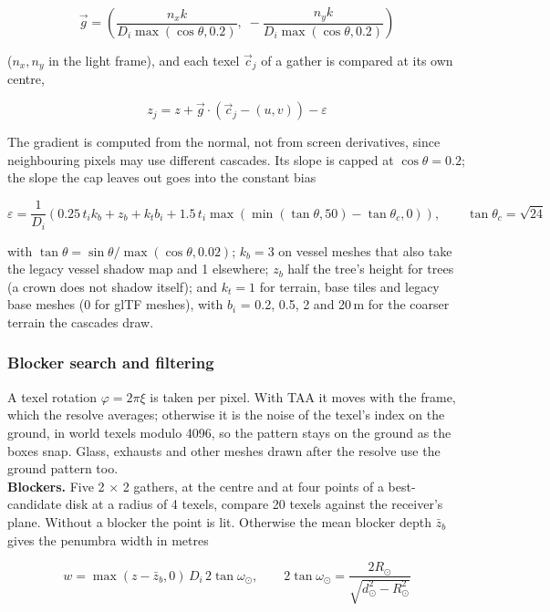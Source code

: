 \documentclass[Orbiter Technical Reference.tex]{subfiles}
\begin{document}
\begin{sloppypar}
\[ \vec{g} = \left( \frac{n_{x} k}{D_{i}\max(\cos\theta, 0.2)},\; -\frac{n_{y} k}{D_{i}\max(\cos\theta, 0.2)} \right) \]

\noindent
($n_{x}, n_{y}$ in the light frame), and each texel $\vec{c}_{j}$ of a gather is compared at its own centre,

\[ z_{j} = z + \vec{g} \cdot (\vec{c}_{j} - (u, v)) - \varepsilon \]

\noindent
The gradient is computed from the normal, not from screen derivatives, since neighbouring pixels may use different cascades. Its slope is capped at $\cos\theta = 0.2$; the slope the cap leaves out goes into the constant bias

\[ \varepsilon = \frac{1}{D_{i}} \left( 0.25\,t_{i}k_{b} + z_{b} + k_{t}b_{i} + 1.5\,t_{i} \max\left(\min\left(\tan\theta, 50\right) - \tan\theta_{c}, 0\right) \right), \qquad \tan\theta_{c} = \sqrt{24} \]

\noindent
with $\tan\theta = \sin\theta/\max(\cos\theta, 0.02)$; $k_{b} = 3$ on vessel meshes that also take the legacy vessel shadow map and 1 elsewhere; $z_{b}$ half the tree's height for trees (a crown does not shadow itself); and $k_{t} = 1$ for terrain, base tiles and legacy base meshes (0 for glTF meshes), with $b_{i}$ = 0.2, 0.5, 2 and 20\,m for the coarser terrain the cascades draw.

\subsubsection{Blocker search and filtering}
A texel rotation $\varphi = 2\pi\xi$ is taken per pixel. With TAA it moves with the frame, which the resolve averages; otherwise it is the noise of the texel's index on the ground, in world texels modulo 4096, so the pattern stays on the ground as the boxes snap. Glass, exhausts and other meshes drawn after the resolve use the ground pattern too.\\
\textbf{Blockers.} Five 2 $\times$ 2 gathers, at the centre and at four points of a best-candidate disk \cite{mitchell1991} at a radius of 4 texels, compare 20 texels against the receiver's plane. Without a blocker the point is lit. Otherwise the mean blocker depth $\bar{z}_{b}$ gives the penumbra width in metres \cite{fernando2005}

\[ w = \max(z - \bar{z}_{b}, 0)\, D_{i}\, 2\tan\omega_{\odot}, \qquad 2\tan\omega_{\odot} = \frac{2R_{\odot}}{\sqrt{d_{\odot}^{2} - R_{\odot}^{2}}} \]


\end{sloppypar}
\end{document}
